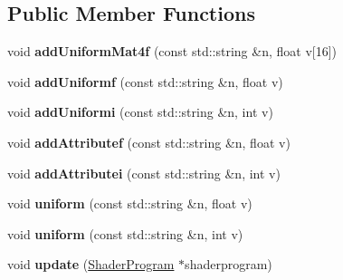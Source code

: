 \subsection*{Public Member Functions}
\begin{DoxyCompactItemize}
\item 
\hypertarget{structvsr_1_1_shader_data_aa3b18ebcc9a41acfb723e2478651f967}{void {\bfseries add\-Uniform\-Mat4f} (const std\-::string \&n, float v\mbox{[}16\mbox{]})}\label{structvsr_1_1_shader_data_aa3b18ebcc9a41acfb723e2478651f967}

\item 
\hypertarget{structvsr_1_1_shader_data_a75851f31eb0147dc1ec78194850ec162}{void {\bfseries add\-Uniformf} (const std\-::string \&n, float v)}\label{structvsr_1_1_shader_data_a75851f31eb0147dc1ec78194850ec162}

\item 
\hypertarget{structvsr_1_1_shader_data_af815cb450f9c06e6f3ed11790224d1f6}{void {\bfseries add\-Uniformi} (const std\-::string \&n, int v)}\label{structvsr_1_1_shader_data_af815cb450f9c06e6f3ed11790224d1f6}

\item 
\hypertarget{structvsr_1_1_shader_data_aeb003fdac56a8faea345827b215d64d7}{void {\bfseries add\-Attributef} (const std\-::string \&n, float v)}\label{structvsr_1_1_shader_data_aeb003fdac56a8faea345827b215d64d7}

\item 
\hypertarget{structvsr_1_1_shader_data_a7322b6ec6d4a395d45284fb8aecb6409}{void {\bfseries add\-Attributei} (const std\-::string \&n, int v)}\label{structvsr_1_1_shader_data_a7322b6ec6d4a395d45284fb8aecb6409}

\item 
\hypertarget{structvsr_1_1_shader_data_a516e26de61472ae32476149b626fbdf5}{void {\bfseries uniform} (const std\-::string \&n, float v)}\label{structvsr_1_1_shader_data_a516e26de61472ae32476149b626fbdf5}

\item 
\hypertarget{structvsr_1_1_shader_data_a8a015a839715841812f670c055672fa7}{void {\bfseries uniform} (const std\-::string \&n, int v)}\label{structvsr_1_1_shader_data_a8a015a839715841812f670c055672fa7}

\item 
\hypertarget{structvsr_1_1_shader_data_aa1a3c6310b024ac6acc727958e9a5ca7}{void {\bfseries update} (\hyperlink{classvsr_1_1_shader_program}{Shader\-Program} $\ast$shaderprogram)}\label{structvsr_1_1_shader_data_aa1a3c6310b024ac6acc727958e9a5ca7}

\end{DoxyCompactItemize}
